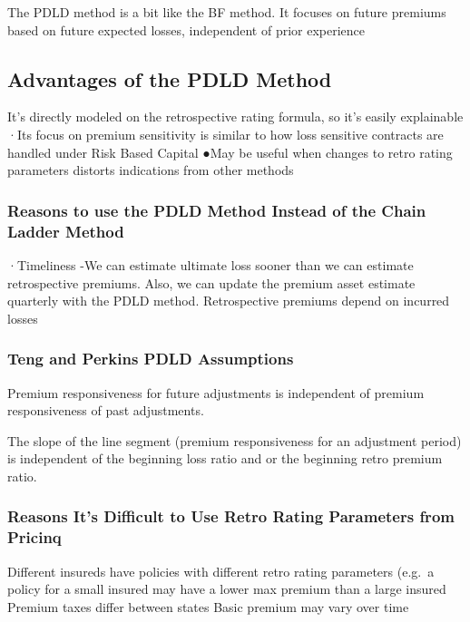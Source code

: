 \documentclass[
]{article}
\begin{document}
The PDLD method is a bit like the BF method. It focuses on future
premiums based on future expected losses, independent of prior
experience

\subsection{Advantages of the PDLD
Method}\label{advantages-of-the-pdld-method}

It's directly modeled on the retrospective rating formula, so it's
easily explainable ·Its focus on premium sensitivity is similar to how
loss sensitive contracts are handled under Risk Based Capital ●May be
useful when changes to retro rating parameters distorts indications from
other methods

\subsubsection{Reasons to use the PDLD Method Instead of the Chain
Ladder
Method}\label{reasons-to-use-the-pdld-method-instead-of-the-chain-ladder-method}

·Timeliness -We can estimate ultimate loss sooner than we can estimate
retrospective premiums. Also, we can update the premium asset estimate
quarterly with the PDLD method. Retrospective premiums depend on
incurred losses

\subsubsection{Teng and Perkins PDLD
Assumptions}\label{teng-and-perkins-pdld-assumptions}

Premium responsiveness for future adjustments is independent of premium
responsiveness of past adjustments.

The slope of the line segment (premium responsiveness for an adjustment
period) is independent of the beginning loss ratio and or the beginning
retro premium ratio.

\subsubsection{Reasons It's Difficult to Use Retro Rating Parameters
from
Pricinq}\label{reasons-its-difficult-to-use-retro-rating-parameters-from-pricinq}

Different insureds have policies with different retro rating parameters
(e.g.~a policy for a small insured may have a lower max premium than a
large insured Premium taxes differ between states Basic premium may vary
over time
\end{document}
